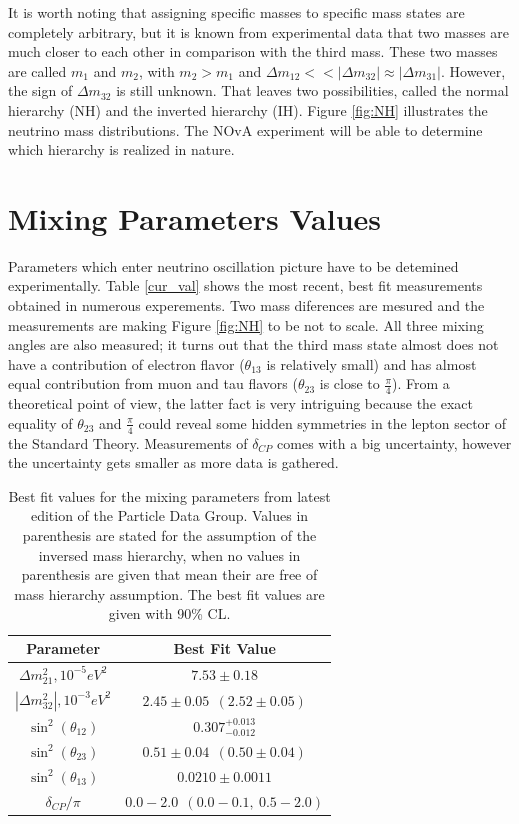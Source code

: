 It is worth noting that assigning specific masses to specific mass states are completely 
arbitrary, but it is known from experimental data that two masses are much closer to each other 
in comparison with the third mass. These two masses are called $m_1$ and $m_2$, with $m_2 > m_1$ 
and $\Delta m_{12} << |\Delta m_{32}| \approx |\Delta m_{31}|$. However, the sign of $\Delta m_{32}$ 
is still unknown. That leaves two possibilities, called the normal hierarchy (NH) and the inverted 
hierarchy (IH). Figure \ref{fig:NH} illustrates the neutrino mass distributions. The NOvA experiment 
will be able to determine which hierarchy is realized in nature.

\section{Mixing Parameters Values}
Parameters which enter neutrino oscillation picture have to be detemined experimentally. Table \ref{cur_val}
shows the most recent, best fit measurements obtained in numerous experements. Two mass diferences are 
mesured and the measurements are making Figure \ref{fig:NH} to be not to scale. All three mixing angles
are also measured; it turns out that the third mass state almost does not have a contribution of electron 
flavor ($\theta_{13}$ is relatively small) and has almost equal contribution from muon and tau flavors
($\theta_{23}$ is close to $\frac{\pi}{4}$). From a theoretical point of view, the latter fact is very 
intriguing because the exact equality of $\theta_{23}$ and $\frac{\pi}{4}$ could reveal some hidden symmetries 
in the lepton sector of the Standard Theory. Measurements of $\delta_{CP}$ comes with a big uncertainty, 
however the uncertainty gets smaller as more data is gathered.
\begin{table}
\begin{center}
  \renewcommand{\arraystretch}{1.4}
  \begin{tabular}{| c | c |}
    \hline
    \textbf{Parameter}                & \textbf{Best Fit Value} \\ \hline \hline
    $\Delta  m_{21}^2,  10^{-5} eV^2$ & $7.53\pm 0.18$  \\ \hline
    $|\Delta m_{32}^2|, 10^{-3} eV^2$ & $2.45\pm 0.05~~(2.52\pm 0.05)$ \\ \hline
    $\sin^2(\theta_{12})$             & $0.307^{+0.013}_{-0.012}$ \\ \hline
    $\sin^2(\theta_{23})$             & $0.51\pm 0.04~~ (0.50\pm 0.04)$ \\ \hline
    $\sin^2(\theta_{13})$             & $0.0210\pm 0.0011$ \\ \hline
    $\delta_{CP}/\pi$                 & $0.0-2.0~~(0.0-0.1,~ 0.5-2.0)$  \\
    \hline
  \end{tabular}
\caption{Best fit values for the mixing parameters from latest edition of the Particle Data Group. Values in parenthesis are stated for the assumption of the inversed mass hierarchy, when no values in parenthesis are given that mean their are free of mass hierarchy assumption. The best fit values are given with 90\% CL.} 
\end{center}
\end{table}

